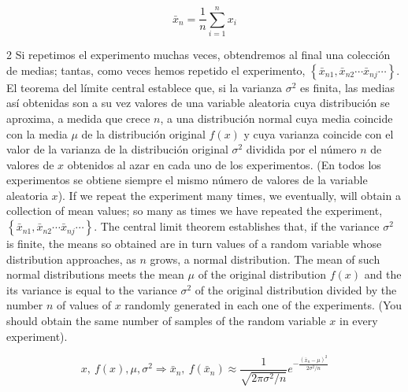 \begin{equation*}
\bar{x}_n=\frac{1}{n}\sum_{i=1}^n x_i
\end{equation*}
\begin{paracol}{2}
Si repetimos el experimento muchas veces, obtendremos al final una colección de medias; tantas, como veces hemos repetido el experimento,
$\left\{\bar{x}_{n1}, \bar{x}_{n2} \cdots \bar{x}_{nj} \cdots \right\}$. El teorema del límite central establece que, si la varianza $\sigma^2$ es finita, las medias así obtenidas son a su vez valores de una variable aleatoria cuya distribución se aproxima, a medida que crece $n$, a una distribución normal cuya media coincide con la media $\mu$ de la distribución original $f(x)$ y cuya varianza coincide con el valor de la varianza de la distribución original $\sigma^2$ dividida por el número $n$ de valores de $x$ obtenidos al azar en cada uno de los experimentos. (En todos los experimentos se obtiene siempre el mismo número de valores de la variable aleatoria $x$).
\switchcolumn
If we repeat the experiment many times, we eventually, will obtain a collection of mean values; so many as times we have repeated the experiment, $\left\{\bar{x}_{n1}, \bar{x}_{n2} \cdots \bar{x}_{nj} \cdots \right\}$. The central limit theorem establishes that, if the variance $\sigma^2$ is finite, the means so obtained are in turn values of a random variable whose distribution approaches, as $n$ grows, a normal distribution. The mean of such normal distributions meets the mean $\mu$  of the original distribution $f(x)$ and the its variance is equal to the variance $\sigma^2$ of the original distribution divided by the number $n$ of values of $x$ randomly generated in each one of the experiments. (You should obtain the same number of samples of the random variable $x$ in every experiment). 
\end{paracol}

\begin{equation*}
x, \ f(x), \mu, \sigma^2 \Rightarrow \bar{x}_n,\ f(\bar{x}_n)\approx\frac{1}{\sqrt{2\pi\sigma^2/n}}e^{-\frac{(\bar{x}_n-\mu)^2}{2\sigma^2/n}}  
\end{equation*}


